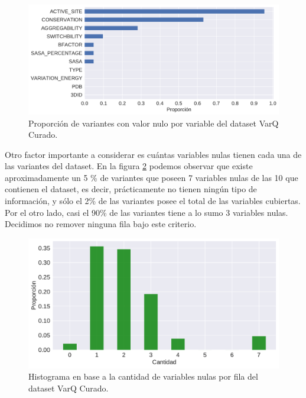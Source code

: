 \begin{figure}[H]
    \centering
    \includegraphics[scale=0.6]{documents/latex/figures/3/varq/proporcion_nulos.pdf}
    \caption{Proporción de variantes con valor nulo por variable del dataset VarQ Curado.}
    \label{fig:proporcion_nulos_varq}
\end{figure}

Otro factor importante a considerar es cuántas variables nulas tienen cada una de las variantes del dataset. En la figura \ref{fig:nulos_varq} podemos observar que existe aproximadamente un 5 \% de variantes que poseen 7 variables nulas de las 10 que contienen el dataset, es decir, prácticamente no tienen ningún tipo de información, y sólo el 2\% de las variantes posee el total de las variables cubiertas. Por el otro lado, casi el 90\% de las variantes tiene a lo sumo 3 variables nulas. Decidimos no remover ninguna fila bajo este criterio.

\begin{figure}[H]
    \centering
    \includegraphics[scale=0.6]{documents/latex/figures/3/varq/nulos_varq.pdf}
    \caption{Histograma en base a la cantidad de variables nulas por fila del dataset VarQ Curado.}
    \label{fig:nulos_varq}
\end{figure}


